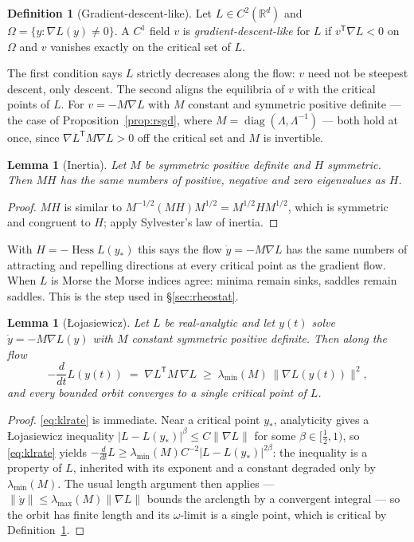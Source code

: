 \documentclass[11pt]{article}
\theoremstyle{plain}
\newtheorem{lemma}[theorem]{Lemma}
\theoremstyle{definition}
\newtheorem{definition}[theorem]{Definition}
\theoremstyle{remark}
\newcommand{\R}{\mathbb{R}}
\newcommand{\grad}{\nabla}
\begin{document}
\begin{definition}[Gradient-descent-like]\label{def:gdl}
Let $L \in C^2(\R^d)$ and $\Omega = \{y : \grad L(y) \neq 0\}$. A $C^1$ field
$v$ is \emph{gradient-descent-like} for $L$ if $v^{\mathsf T}\grad L < 0$ on
$\Omega$ and $v$ vanishes exactly on the critical set of $L$.
\end{definition}

The first condition says $L$ strictly decreases along the flow: $v$ need not
be steepest descent, only descent. The second aligns the equilibria of $v$
with the critical points of $L$. For $v = -M\grad L$ with $M$ constant and
symmetric positive definite --- the case of Proposition~\ref{prop:rsgd},
where $M = \operatorname{diag}(\Lambda, \Lambda^{-1})$ --- both hold at once,
since $\grad L^{\mathsf T}M\grad L > 0$ off the critical set and $M$ is
invertible.

\begin{lemma}[Inertia]\label{lem:inertia}
Let $M$ be symmetric positive definite and $H$ symmetric. Then $MH$ has the
same numbers of positive, negative and zero eigenvalues as $H$.
\end{lemma}

\begin{proof}
$MH$ is similar to $M^{-1/2}(MH)M^{1/2} = M^{1/2}HM^{1/2}$, which is symmetric
and congruent to $H$; apply Sylvester's law of inertia.
\end{proof}

With $H = -\operatorname{Hess}L(y_*)$ this says the flow $\dot y = -M\grad L$
has the same numbers of attracting and repelling directions at every critical
point as the gradient flow. When $L$ is Morse the Morse indices agree: minima
remain sinks, saddles remain saddles. This is the step used in
\S\ref{sec:rheostat}.

\begin{lemma}[{\L}ojasiewicz]\label{lem:kl}
Let $L$ be real-analytic and let $y(t)$ solve $\dot y = -M\grad L(y)$ with $M$
constant symmetric positive definite. Then along the flow
\begin{equation}\label{eq:klrate}
  -\frac{d}{dt}L(y(t)) \;=\; \grad L^{\mathsf T}M\,\grad L
  \;\geq\; \lambda_{\min}(M)\,\|\grad L(y(t))\|^2,
\end{equation}
and every bounded orbit converges to a single critical point of $L$.
\end{lemma}

\begin{proof}
\eqref{eq:klrate} is immediate. Near a critical point $y_*$, analyticity gives
a {\L}ojasiewicz inequality $|L - L(y_*)|^{\beta} \leq C\|\grad L\|$ for some
$\beta \in [\tfrac12, 1)$, so \eqref{eq:klrate} yields
$-\tfrac{d}{dt}L \geq \lambda_{\min}(M)C^{-2}|L - L(y_*)|^{2\beta}$: the
inequality is a property of $L$, inherited with its exponent and a constant
degraded only by $\lambda_{\min}(M)$. The usual length argument then applies
--- $\|\dot y\| \leq \lambda_{\max}(M)\|\grad L\|$ bounds the arclength by a
convergent integral --- so the orbit has finite length and its $\omega$-limit
is a single point, which is critical by Definition~\ref{def:gdl}.
\end{proof}
\end{document}
